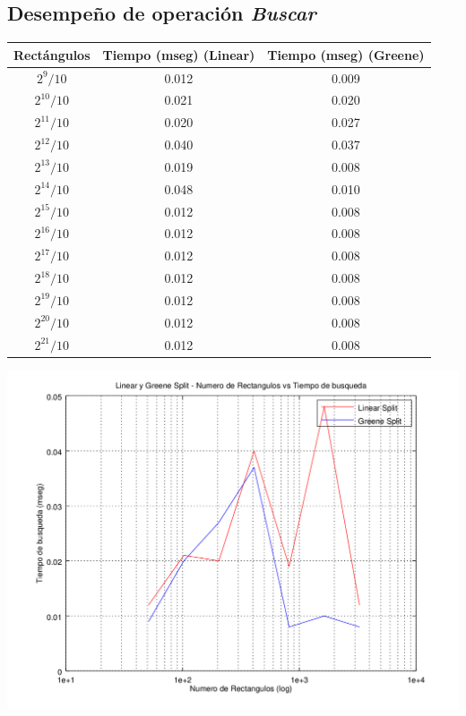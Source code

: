 \documentclass[letterpaper,10pt]{article}
\begin{document}
	\newpage

	\subsection{Desempeño de operación \textit{Buscar}}

	\begin{center}

		\begin{tabular}{|c|c||c|}
			\hline
			Rectángulos	& Tiempo (mseg) (Linear) & Tiempo (mseg) (Greene) \\
			\hline
			$2^{9}/10$ 	& 0.012	& 0.009\\
			\hline
			$2^{10}/10$ 	& 0.021	& 0.020\\
			\hline
			$2^{11}/10$ 	& 0.020	& 0.027\\
			\hline
			$2^{12}/10$ 	& 0.040	& 0.037\\
			\hline
			$2^{13}/10$ 	& 0.019	& 0.008\\
			\hline
			$2^{14}/10$ 	& 0.048	& 0.010\\
			\hline
			$2^{15}/10$ 	& 0.012	& 0.008\\
			\hline
			$2^{16}/10$ 	& 0.012	& 0.008\\
			\hline
			$2^{17}/10$ 	& 0.012	& 0.008\\
			\hline
			$2^{18}/10$ 	& 0.012	& 0.008\\
			\hline
			$2^{19}/10$ 	& 0.012	& 0.008\\
			\hline
			$2^{20}/10$ 	& 0.012	& 0.008\\
			\hline
			$2^{21}/10$ 	& 0.012	& 0.008\\
			\hline
		\end{tabular}

		\includegraphics[width=0.75\textheight]{fig3.png}
	\end{center}
\end{document}
